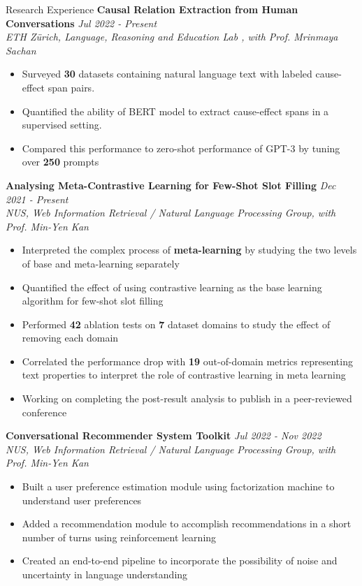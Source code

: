 \documentclass[40]{resume} %
\begin{document}
\begin{rSection}{Research Experience}
  \vspace{0.3cm}
  {\bf Causal Relation Extraction from Human Conversations} \hfill {\em Jul 2022 - Present} 
\\ \textit{ETH Zürich, Language, Reasoning and Education Lab
, with Prof. Mrinmaya Sachan} \hfill { \em }
\begin{itemize}
\item Surveyed \textbf{30} datasets containing natural language text with labeled cause-effect span pairs.
\item Quantified the ability of BERT model to extract cause-effect spans in a supervised setting.
\item Compared this performance to zero-shot performance of GPT-3 by tuning over \textbf{250} prompts
\end{itemize}
\vspace{0.2cm}
{\bf Analysing Meta-Contrastive Learning for Few-Shot Slot Filling} \hfill {\em Dec 2021 - Present} 
\\ \textit{NUS, Web Information Retrieval / Natural Language Processing Group, with Prof. Min-Yen Kan} \hfill { \em }
\begin{itemize}
\item Interpreted the complex process of \textbf{meta-learning} by studying the two levels of base and meta-learning separately
\item Quantified the effect of using contrastive learning as the base learning algorithm for few-shot slot filling
\item Performed \textbf{42} ablation tests on \textbf{7} dataset domains to study the effect of removing each domain
\item Correlated the performance drop with \textbf{19} out-of-domain metrics representing text properties to interpret the role of contrastive learning in meta learning
\item Working on completing the post-result analysis to publish in a peer-reviewed conference
\end{itemize}

\vspace{0.2cm}
{\bf Conversational Recommender System Toolkit} \hfill {\em Jul 2022 - Nov 2022} 
\\ \textit{NUS, Web Information Retrieval / Natural Language Processing Group, with Prof. Min-Yen Kan} \hfill { \em }
\begin{itemize}
\item Built a user preference estimation module using factorization
machine to understand user preferences
\item Added a recommendation module to accomplish recommendations in a short number of turns using reinforcement learning
\item Created an end-to-end pipeline to incorporate the possibility of noise and uncertainty in language understanding
\end{itemize}


\end{rSection}
\end{document}
